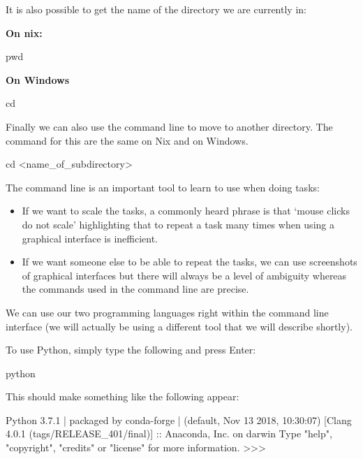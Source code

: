 It is also possible to get the name of the directory we are currently in:

\textbf{On nix:}

\begin{cliin}
pwd
\end{cliin}

\textbf{On Windows}

\begin{cliin}
cd
\end{cliin}

Finally we can also use the command line to move to another directory. The
command for this are the same on Nix and on Windows.

\begin{cliin}
cd <name_of_subdirectory>
\end{cliin}


The command line is an important tool to learn to use when doing tasks:

\begin{itemize}
    \item If we want to scale the tasks, a commonly heard phrase is that `mouse
        clicks do not scale' highlighting that to repeat a task many times when
        using a graphical interface is inefficient.
    \item If we want someone else to be able to repeat the tasks, we can use
        screenshots of graphical interfaces but there will always be a level of
        ambiguity whereas the commands used in the command line are precise.
\end{itemize}

We can use our two programming languages right within the command line interface
(we will actually be using a different tool that we will describe shortly).

To use Python, simply type the following and press Enter:

\begin{cliin}
python
\end{cliin}

This should make something like the following appear:

\begin{cliout}
Python 3.7.1 | packaged by conda-forge | (default, Nov 13 2018, 10:30:07)
[Clang 4.0.1 (tags/RELEASE_401/final)] :: Anaconda, Inc. on darwin
Type "help", "copyright", "credits" or "license" for more information.
>>>
\end{cliout}

